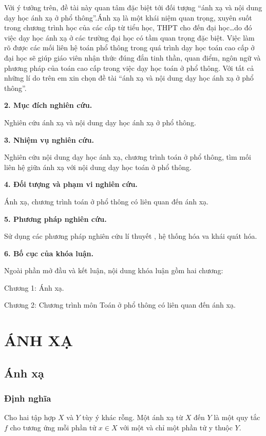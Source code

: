 \documentclass[12pt,oneside,a4paper,reqno]{book}
\begin{document}
Với ý tưởng trên, đề tài này quan tâm đặc biệt tới đối tượng “ánh xạ và nội dung dạy học ánh xạ ở phổ thông”.Ánh xạ là một khái niệm quan trọng, xuyên suốt trong chương trình học của các cấp từ tiểu học, THPT cho đến đại học…do đó việc dạy học ánh xạ ở các trường đại học có tầm quan trọng đặc biệt. Việc làm rõ được các mối liên hệ toán phổ thông  trong quá trình dạy học toán cao cấp ở đại học sẽ giúp giáo viên nhận thức đúng đắn tinh thần, quan điểm, ngôn ngữ và phương pháp của toán cao cấp trong việc dạy học toán ở phổ thông.
Với tất cả những lí do trên em xin chọn đề tài “ánh xạ và nội dung dạy học ánh xạ ở phổ thông”.

 \medskip
\textbf{2.	Mục đích nghiên cứu.}

 Nghiên cứu ánh xạ và nội dung dạy học ánh xạ ở phổ thông.
 \medskip
 
 \textbf{3.	Nhiệm vụ nghiên cứu.}

 Nghiên cứu nội dung dạy học ánh xạ, chương trình toán ở phổ thông, tìm mối liên hệ giữa ánh xạ với nội dung dạy học toán ở phổ thông.
  \medskip
  
\textbf{4.	Đối tượng và phạm vi nghiên cứu.}

Ánh xạ, chương trình toán ở phổ thông có liên quan đến ánh xạ.
 \medskip
 
\textbf{5.	Phương pháp nghiên cứu.}

Sử dụng các phương pháp nghiên cứu lí thuyết , hệ thống hóa va khái quát hóa.
 \medskip
 
\textbf{6.	Bố cục của khóa luận.}

Ngoài phần mở đầu và kết luận, nội dung khóa luận gồm hai chương:

          Chương 1:  Ánh xạ.
          
           Chương 2: Chương trình môn Toán ở phổ thông có liên quan đến ánh xạ.



\chapter{ÁNH XẠ}
\section{Ánh xạ}
\subsection{Định nghĩa}
Cho hai tập hợp $X$ và $Y$ tùy ý khác rỗng.
Một ánh xạ từ $X$ đến $Y$ là một quy tắc $f$ cho tương ứng mỗi phần tử $x\in X$ với một và chỉ một phần tử y thuộc $Y$.
\end{document}
